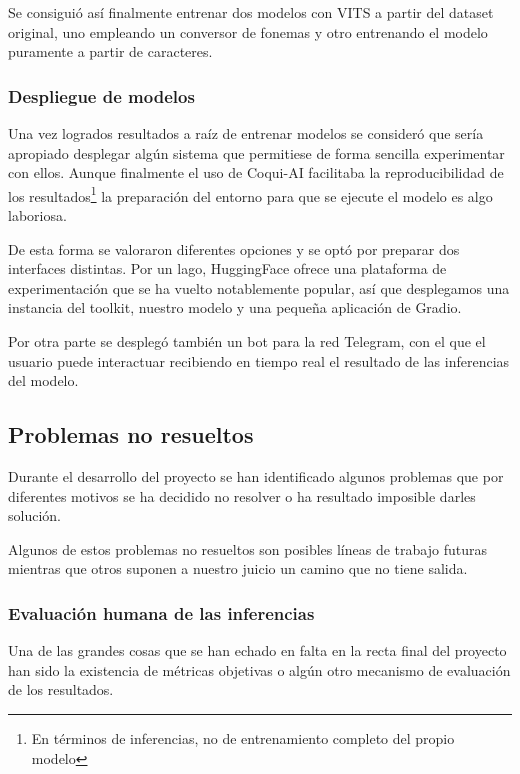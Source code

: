 Se consiguió así finalmente entrenar dos modelos con VITS a partir del dataset original, uno empleando un conversor de fonemas y otro entrenando el modelo puramente a partir de caracteres.

\subsubsection{Despliegue de modelos}

Una vez logrados resultados a raíz de entrenar modelos se consideró que sería apropiado desplegar algún sistema que permitiese de forma sencilla experimentar con ellos. Aunque finalmente el uso de Coqui-AI facilitaba la reproducibilidad de los resultados\footnote{En términos de inferencias, no de entrenamiento completo del propio modelo} la preparación del entorno para que se ejecute el modelo es algo laboriosa.

De esta forma se valoraron diferentes opciones y se optó por preparar dos interfaces distintas. Por un lago, HuggingFace ofrece una plataforma de experimentación que se ha vuelto notablemente popular, así que desplegamos una instancia del toolkit, nuestro modelo y una pequeña aplicación de Gradio.

Por otra parte se desplegó también un bot para la red Telegram, con el que el usuario puede interactuar recibiendo en tiempo real el resultado de las inferencias del modelo.

\subsection{Problemas no resueltos}

Durante el desarrollo del proyecto se han identificado algunos problemas que por diferentes motivos se ha decidido no resolver o ha resultado imposible darles solución.

Algunos de estos problemas no resueltos son posibles líneas de trabajo futuras mientras que otros suponen a nuestro juicio un camino que no tiene salida.

\subsubsection{Evaluación humana de las inferencias}

Una de las grandes cosas que se han echado en falta en la recta final del proyecto han sido la existencia de métricas objetivas o algún otro mecanismo de evaluación de los resultados.

